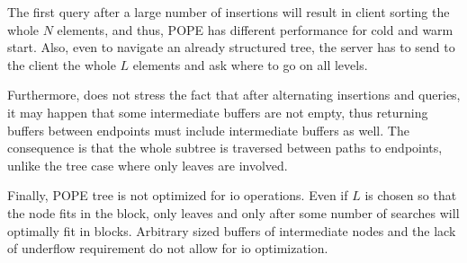		The first query after a large number of insertions will result in client sorting the whole $N$ elements, and thus, POPE has different performance for cold and warm start.
		Also, even to navigate an already structured tree, the server has to send to the client the whole $L$ elements and ask where to go on all levels.

		Furthermore, \cite{pope} does not stress the fact that after alternating insertions and queries, it may happen that some intermediate buffers are not empty, thus returning buffers between endpoints must include intermediate buffers as well. %
		The consequence is that the whole subtree is traversed between paths to endpoints, unlike the {\BPlus} tree case where only leaves are involved.

		Finally, POPE tree is not optimized for \acrshort{io} operations.
		Even if $L$ is chosen so that the node fits in the block, only leaves and only after some number of searches will optimally fit in blocks.
		Arbitrary sized buffers of intermediate nodes and the lack of underflow requirement do not allow for \acrshort{io} optimization.
